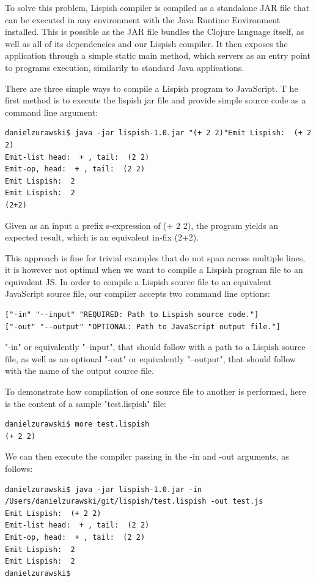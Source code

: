 To solve this problem, Lispish compiler is compiled as a standalone JAR file that can be executed in any environment with the Java Runtime Environment installed. This is possible as the JAR file bundles the Clojure language itself, as well as all of its dependencies and our Lispish compiler. It then exposes the application through a simple static main method, which servers as an entry point to programs execution, similarily to standard Java applications. 

There are three simple ways to compile a Lispish program to JavaScript. T
he first method is to execute the lispish jar file and provide simple source code as a command line argument:

\begin{verbatim}
danielzurawski$ java -jar lispish-1.0.jar "(+ 2 2)"Emit Lispish:  (+ 2 2)
Emit-list head:  + , tail:  (2 2)
Emit-op, head:  + , tail:  (2 2)
Emit Lispish:  2
Emit Lispish:  2
(2+2)
\end{verbatim}

Given as an input a prefix s-expression of (+ 2 2), the program yields an expected result, which is an equivalent in-fix (2+2).

This approach is fine for trivial examples that do not span across multiple lines, it is however not optimal when we want to compile a Lispish program file to an equivalent JS. 
In order to compile a Lispish source file to an equivalent JavaScript source file, our compiler accepts two command line options:

\begin{verbatim}
["-in" "--input" "REQUIRED: Path to Lispish source code."]
["-out" "--output" "OPTIONAL: Path to JavaScript output file."]
\end{verbatim}

"-in" or equivalently "--input", that should follow with a path to a Lispish source file, as well as an optional 
"-out" or equivalently "--output", that should follow with the name of the output source file. 

To demonstrate how compilation of one source file to another is performed, here is the content of a sample "test.lispish" file:

\begin{verbatim}
danielzurawski$ more test.lispish
(+ 2 2)
\end{verbatim}

We can then execute the compiler passing in the -in and -out arguments, as follows:

\begin{verbatim}
danielzurawski$ java -jar lispish-1.0.jar -in /Users/danielzurawski/git/lispish/test.lispish -out test.js
Emit Lispish:  (+ 2 2)
Emit-list head:  + , tail:  (2 2)
Emit-op, head:  + , tail:  (2 2)
Emit Lispish:  2
Emit Lispish:  2
danielzurawski$
\end{verbatim}

